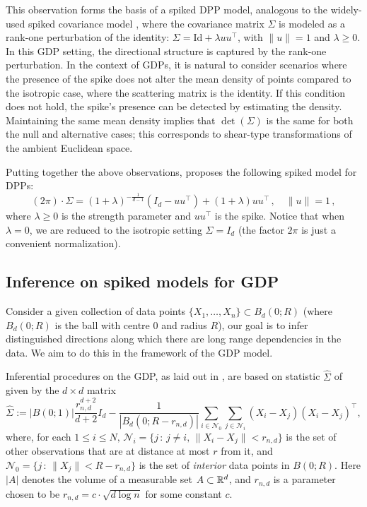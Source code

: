 This observation forms the basis of a spiked DPP model, analogous to the widely-used spiked covariance model \cite{BBP}, where the covariance matrix $\Sigma$ is modeled as a rank-one perturbation of the identity: $\Sigma = \text{Id} + \lambda uu^\top$, with $\|u\|=1$ and $\lambda \geq 0$. In this GDP setting, the directional structure is captured by the rank-one perturbation. In the context of GDPs, it is natural to consider scenarios where the presence of the spike does not alter the mean density of points compared to the isotropic case, where the scattering matrix is the identity. If this condition does not hold, the spike's presence can be detected by estimating the density. Maintaining the same mean density implies that $\det(\Sigma)$ is the same for both the null and alternative cases; this corresponds to shear-type transformations of the ambient Euclidean space.

Putting together the above observations, \cite{GDP} proposes the following spiked model for DPPs:
\begin{equation}
\label{eq:spike}
(2\pi) \cdot \Sigma=(1+\lambda)^{-\frac1{d-1}}(I_d-uu^\top) + (1+\lambda) uu^\top\,, \quad \|u\|=1\,,
\end{equation}
where $\lambda\ge 0$ is the strength parameter and $uu^\top$ is the spike. Notice that when $\lambda =0$, we are reduced to the isotropic setting $\Sigma=I_d$ (the factor $2 \pi$ is just a convenient normalization). 

\subsection{Inference on spiked models for GDP}
Consider a given collection of data points $\{X_1,\ldots,X_n\} \subset B_d(0;R)$ (where  $B_d(0;R)$ is the ball with centre 0 and radius $R$),  our goal is to infer distinguished directions along which there are long range dependencies in the data. We aim to do this in the framework of the GDP model. 

Inferential procedures on the GDP, as laid out in \cite{GDP}, are based on statistic $\hat \Sigma$ of  given by the $d \times d$ matrix
$$
\hat \Sigma := |B(0;1)|\frac{r_{n,d}^{d+2}}{d+2} I_d - \frac{1}{|B_d(0;R-r_{n,d})|}\sum_{i \in \mathcal{N}_0} \sum_{j \in \mathcal{N}_i} (X_i-X_j)(X_i-X_j)^\top ,
$$
where, for each $1\le i \le N, \, \mathcal{N}_i=\{j\,:\,j\ne i,  \,\|X_i-X_j\| < r_{n,d} \}$ is the  set of other observations that are at distance at most $r$ from it, and $\mathcal{N}_0=\{j\,:\, \|X_j\| < R-r_{n,d} \}$ is the set of \textit{interior} data points in $B(0;R)$. Here $|A|$ denotes the volume of a measurable set $A \subset \mathbb{R}^d$, and $r_{n,d}$ is a parameter chosen to be $r_{n,d}= c \cdot \sqrt{d \log n}$ for some constant $c$.


